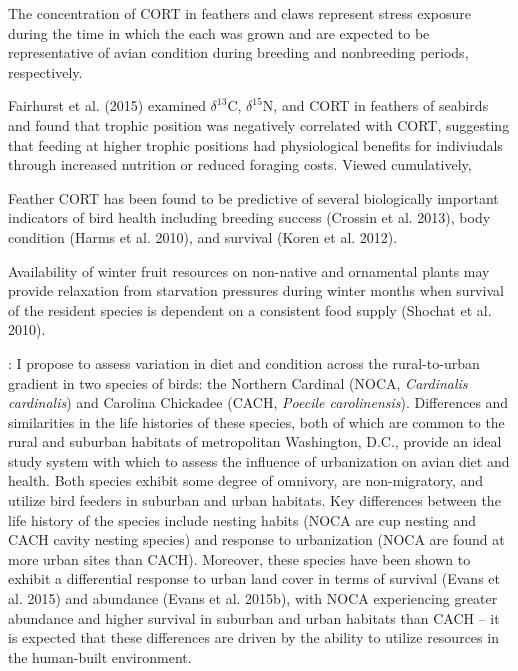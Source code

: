 \documentclass[12pt]{article}
\begin{document}
The concentration of CORT in feathers and claws represent stress exposure during the time in which the each was grown and are expected to be representative of avian condition during breeding and nonbreeding periods, respectively.

\par

Fairhurst et al. (2015) examined $\delta^{13}$C,  $\delta^{15}$N, and CORT in feathers of seabirds and found that trophic position was negatively correlated with CORT, suggesting that feeding at higher trophic positions had physiological benefits for indiviudals through increased nutrition or reduced foraging costs.
Viewed cumulatively, \par


Feather CORT has been found to be predictive of several biologically important indicators of bird health including breeding success (Crossin et al. 2013), body condition (Harms et al. 2010), and survival (Koren et al. 2012).

Availability of winter fruit resources on non-native and ornamental plants may provide relaxation from starvation pressures during winter months when survival of the resident species is dependent on a consistent food supply (Shochat et al. 2010).


: I propose to assess variation in diet and condition across the rural-to-urban gradient in two species of birds: the Northern Cardinal (NOCA, \textit{Cardinalis cardinalis}) and Carolina Chickadee (CACH, \textit{Poecile carolinensis}). Differences and similarities in the life histories of these species, both of which are common to the rural and suburban habitats of metropolitan Washington, D.C., provide an ideal study system with which to assess the influence of urbanization on avian diet and health. Both species exhibit some degree of omnivory, are non-migratory, and utilize bird feeders in suburban and urban habitats. Key differences between the life history of the species include nesting habits (NOCA are cup nesting and CACH cavity nesting species) and response to urbanization (NOCA are found at more urban sites than CACH). Moreover, these species have been shown to exhibit a differential response to urban land cover in terms of survival (Evans et al. 2015) and abundance (Evans et al. 2015b), with NOCA experiencing greater abundance and higher survival in suburban and urban habitats than CACH -- it is expected that these differences are driven by the ability to utilize resources in the human-built environment.
\end{document}
